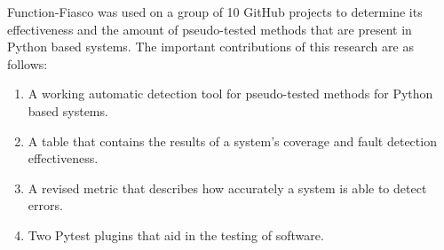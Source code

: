 Function-Fiasco was used on a group of 10 GitHub projects to determine its effectiveness and the amount of pseudo-tested methods that are present in Python based systems. The important contributions of this research are as follows:

\begin{enumerate}
  \item A working automatic detection tool for pseudo-tested methods for Python based systems.
  \item A table that contains the results of a system's coverage and fault detection effectiveness.
  \item A revised metric that describes how accurately a system is able to detect errors.
  \item Two Pytest plugins that aid in the testing of software.
\end{enumerate}

%
